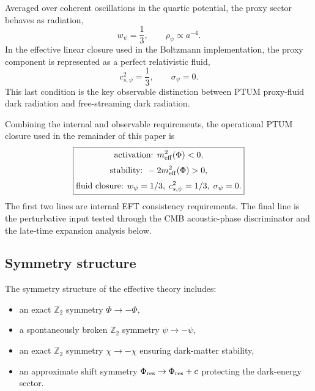 \documentclass[epj]{svjour}
\begin{document}
Averaged over coherent oscillations in the quartic potential, the proxy sector
behaves as radiation,
\begin{equation}
w_\psi=\frac{1}{3},
\qquad
\rho_\psi\propto a^{-4}.
\label{eq:PTUM_quartic_fluid_operational}
\end{equation}
In the effective linear closure used in the Boltzmann implementation, the
proxy component is represented as a perfect relativistic fluid,
\begin{equation}
c_{s,\psi}^2=\frac{1}{3},
\qquad
\sigma_\psi=0 .
\label{eq:PTUM_proxy_signature_operational}
\end{equation}
This last condition is the key observable distinction between PTUM proxy-fluid
dark radiation and free-streaming dark radiation.

Combining the internal and observable requirements, the operational PTUM
closure used in the remainder of this paper is
\begin{equation}
\boxed{
\begin{gathered}
\text{activation: } m_{\rm eff}^2(\Phi)<0,\\[2pt]
\text{stability: } -2m_{\rm eff}^2(\Phi)>0,\\[2pt]
\text{fluid closure: } w_\psi=1/3,\; c_{s,\psi}^2=1/3,\; \sigma_\psi=0 .
\end{gathered}}
\label{eq:ptum_operational_closure}
\end{equation}
The first two lines are internal EFT consistency requirements.  The final line
is the perturbative input tested through the CMB acoustic-phase discriminator
and the late-time expansion analysis below.

\subsection{Symmetry structure}

The symmetry structure of the effective theory includes:

\begin{itemize}
\item an exact \(\mathbb{Z}_2\) symmetry \(\Phi\to-\Phi\),
\item a spontaneously broken \(\mathbb{Z}_2\) symmetry
      \(\psi\to-\psi\),
\item an exact \(\mathbb{Z}_2\) symmetry \(\chi\to-\chi\) ensuring
      dark-matter stability,
\item an approximate shift symmetry
      \(\Phi_{\rm res}\to\Phi_{\rm res}+c\) protecting the
      dark-energy sector.
\end{itemize}
\end{document}
